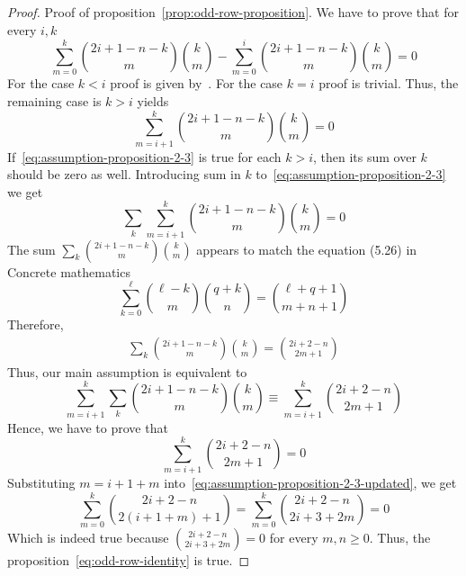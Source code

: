 \begin{proof}
    Proof of proposition~\eqref{prop:odd-row-proposition}.
    We have to prove that for every $i,k$
    \begin{equation*}
        \sum_{m=0}^{k} \binom{2i+1-n-k}{m} \binom{k}{m} - \sum_{m=0}^{i} \binom{2i+1-n-k}{m} \binom{k}{m} = 0
    \end{equation*}
    For the case $k<i$ proof is given by~\cite[proposition 6.0.1]{gregory2022iterated_thesis}.
    For the case $k=i$ proof is trivial.
    Thus, the remaining case is $k>i$ yields
    \begin{equation}
        \sum_{m=i+1}^{k} \binom{2i+1-n-k}{m} \binom{k}{m} = 0
        \label{eq:assumption-proposition-2-3}
    \end{equation}
    If~\eqref{eq:assumption-proposition-2-3} is true for each $k>i$, then its sum over $k$ should be zero as well.
    Introducing sum in $k$ to~\eqref{eq:assumption-proposition-2-3} we get
    \begin{equation*}
        \sum_{k} \sum_{m=i+1}^{k} \binom{2i+1-n-k}{m} \binom{k}{m} = 0
    \end{equation*}
    The sum $\sum_{k} \binom{2i+1-n-k}{m} \binom{k}{m}$ appears to match the equation (5.26) in
    Concrete mathematics~\cite[eq. 5.26]{graham1994concrete}
    \begin{equation}
        \sum_{k=0}^{\ell} \binom{\ell-k}{m} \binom{q+k}{n} = \binom{\ell+q+1}{m+n+1}
        \label{eq:concrete-mathematics-5-26}
    \end{equation}
    Therefore,
    \begin{align*}
        \sum_{k} \binom{2i+1-n-k}{m} \binom{k}{m} = \binom{2i+2-n}{2m+1}
    \end{align*}
    Thus, our main assumption is equivalent to
    \begin{equation*}
        \sum_{m=i+1}^{k} \sum_{k} \binom{2i+1-n-k}{m} \binom{k}{m} \equiv \sum_{m=i+1}^{k} \binom{2i+2-n}{2m+1}
    \end{equation*}
    Hence, we have to prove that
    \begin{equation}
        \sum_{m=i+1}^{k} \binom{2i+2-n}{2m+1} = 0\label{eq:assumption-proposition-2-3-updated}
    \end{equation}
    Substituting $m=i+1+m$ into~\eqref{eq:assumption-proposition-2-3-updated}, we get
    \begin{equation*}
        \sum_{m=0}^{k} \binom{2i+2-n}{2(i+1+m)+1} = \sum_{m=0}^{k} \binom{2i+2-n}{2i+3+2m} = 0
    \end{equation*}
    Which is indeed true because $\binom{2i+2-n}{2i+3+2m}=0$ for every $m,n \geq 0$.
    Thus, the proposition~\eqref{eq:odd-row-identity} is true.
\end{proof}

